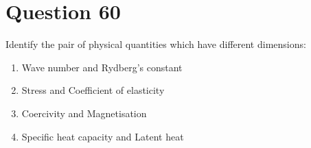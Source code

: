 \documentclass{article}
\begin{document}
\section*{Question 60}
Identify the pair of physical quantities which have different dimensions: 
\begin{enumerate}[label=(\alph*)]
\item Wave number and Rydberg's constant
\item Stress and Coefficient of elasticity
\item Coercivity and Magnetisation
\item Specific heat capacity and Latent heat
\end{enumerate}
\newpage
\end{document}
